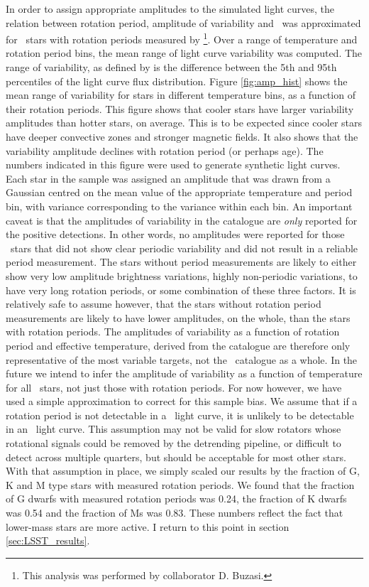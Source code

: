 In order to assign appropriate amplitudes to the simulated light curves,
the relation between rotation period, amplitude of variability
and \teff\ was approximated for \kepler\ stars with rotation periods
measured by \citet{Mcquillan2014}\footnote{This analysis was performed by
collaborator D. Buzasi.}.
Over a range of temperature and rotation period bins, the mean range of light
curve variability was computed.
The range of variability, as defined by \citet{Mcquillan2014} is the
difference between the 5th and 95th percentiles of the light curve flux
distribution.
Figure \ref{fig:amp_hist} shows the mean range of variability for stars in
different temperature bins, as a function of their rotation periods.
This figure shows that cooler stars have larger variability amplitudes than
hotter stars, on average.
This is to be expected since cooler stars have deeper convective zones and
stronger magnetic fields.
It also shows that the variability amplitude declines with rotation period
(or perhaps age).
The numbers indicated in this figure were used to generate synthetic light
curves.
Each star in the sample was assigned an amplitude that was drawn from a
Gaussian centred on the mean value of the appropriate temperature and period
bin, with variance corresponding to the variance within each bin.
An important caveat is that the amplitudes of variability in the
\citet{Mcquillan2014} catalogue are {\it only} reported for the positive
detections.
In other words, no amplitudes were reported for those \kepler\ stars that did
not show clear periodic variability and did not result in a reliable period
measurement.
The stars without period measurements are likely to either show very low
amplitude brightness variations, highly non-periodic variations, to have very
long rotation periods, or some combination of these three factors.
It is relatively safe to assume however, that the stars without rotation
period measurements are likely to have lower amplitudes, on the whole, than
the stars with rotation periods.
The amplitudes of variability as a function of rotation period and effective
temperature, derived from the \citet{Mcquillan2014} catalogue are therefore
only representative of the most variable targets, not the \kepler\ catalogue
as a whole.
In the future we intend to infer the amplitude of variability as a function of
temperature for all \kepler\ stars, not just those with rotation periods.
For now however, we have used a simple approximation to correct for this
sample bias.
We assume that if a rotation period is not detectable in a \kepler\ light
curve, it is unlikely to be detectable in an \LSST\ light curve.
This assumption may not be valid for slow rotators whose rotational signals
could be removed by the \kepler detrending pipeline, or difficult to detect
across multiple \kepler quarters, but should be acceptable for most other
stars.
With that assumption in place, we simply scaled our results by the fraction of
G, K and M type stars with measured rotation periods.
We found that the fraction of G dwarfs with measured rotation periods was
0.24, the fraction of K dwarfs was 0.54 and the fraction of Ms was 0.83.
These numbers reflect the fact that lower-mass stars are more active.
I return to this point in section \textsection\ref{sec:LSST_results}.


